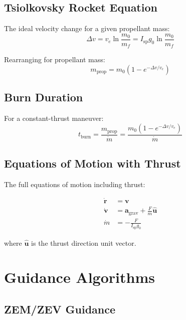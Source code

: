 \documentclass[11pt,a4paper]{article}
\newcommand{\vect}[1]{\bm{#1}}
\begin{document}
\subsection{Tsiolkovsky Rocket Equation}

The ideal velocity change for a given propellant mass:
\begin{equation}
    \Delta v = v_e \ln \frac{m_0}{m_f} = I_\text{sp} g_0 \ln \frac{m_0}{m_f}
    \label{eq:rocket}
\end{equation}

Rearranging for propellant mass:
\begin{equation}
    m_\text{prop} = m_0 \left( 1 - e^{-\Delta v / v_e} \right)
\end{equation}

\subsection{Burn Duration}

For a constant-thrust maneuver:
\begin{equation}
    t_\text{burn} = \frac{m_\text{prop}}{\dot{m}} = \frac{m_0 (1 - e^{-\Delta v / v_e})}{\dot{m}}
\end{equation}

\subsection{Equations of Motion with Thrust}

The full equations of motion including thrust:

\begin{align}
    \dot{\vect{r}} &= \vect{v} \\
    \dot{\vect{v}} &= \vect{a}_\text{grav} + \frac{F}{m} \hat{\vect{u}} \\
    \dot{m} &= -\frac{F}{I_\text{sp} g_0}
\end{align}

where $\hat{\vect{u}}$ is the thrust direction unit vector.

\section{Guidance Algorithms}

\subsection{ZEM/ZEV Guidance}
\end{document}
